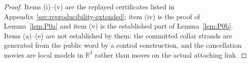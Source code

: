 \begin{proof}
Items (i)--(v) are the replayed certificates listed in
Appendix~\ref{sec:reproducibility-extended}; item (iv) is the proof of
Lemma~\ref{lem:P0a} and item (v) is the established part of
Lemma~\ref{lem:P0b}.  Items (a)--(e) are not established by them: the
committed collar strands are generated from the public word by a control
construction, and the cancellation movies are local models in
$\mathbb R^3$ rather than moves on the actual attaching link.
\end{proof}
